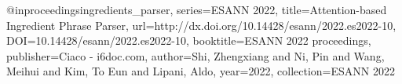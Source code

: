 @inproceedings{ingredients_parser, 
    series={ESANN 2022},
    title={Attention-based Ingredient Phrase Parser},
    url={http://dx.doi.org/10.14428/esann/2022.es2022-10},
    DOI={10.14428/esann/2022.es2022-10},
    booktitle={ESANN 2022 proceedings},
    publisher={Ciaco - i6doc.com},
    author={Shi, Zhengxiang and Ni, Pin and Wang, Meihui and Kim, To Eun and Lipani, Aldo},
    year={2022},
    collection={ESANN 2022} 
}
